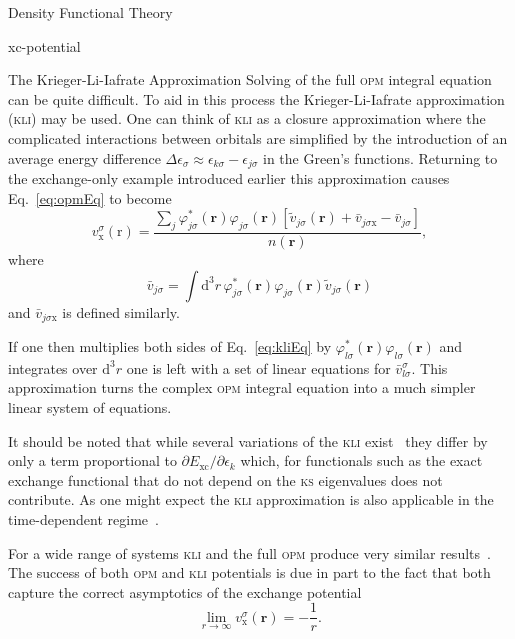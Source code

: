 \documentclass[letterpaper, 11 pt]{report}
\begin{document}
\begin{chapter}{Density Functional Theory \label{chap:dft}}
\begin{section}{xc-potential \label{sec:xcpot}}
\begin{subsection}{The Krieger-Li-Iafrate Approximation \label{sec:kli}}
         Solving of the full \textsc{opm} integral equation can be quite difficult. To aid in this
         process the Krieger-Li-Iafrate approximation~\cite{kli1} (\textsc{kli}) may be used. One can
         think of \textsc{kli} as a closure approximation where the complicated interactions between
         orbitals are simplified by the introduction of an average energy difference
         $\Delta \epsilon_\sigma \approx \epsilon_{k \sigma} - \epsilon_{j \sigma}$ in the Green's
         functions. Returning to the exchange-only example introduced earlier this approximation causes
         Eq.~\eqref{eq:opmEq} to become
         \begin{equation} \label{eq:kliEq}
            v_\mathrm{x}^\sigma(\mathrm{r}) =
               \frac{\sum\limits_{j} \varphi^*_{j \sigma} (\mathbf{r}) \varphi_{j \sigma} (\mathbf{r})
               \left[ \tilde{v}_{j \sigma}(\mathbf{r}) + \bar{v}_{j \sigma \mathrm{x}}
                                               - \bar{v}_{j \sigma} \right]}{n(\mathbf{r})},
         \end{equation}
         where
         \begin{equation}
            \bar{v}_{j \sigma} = \int \mathrm{d}^3 r \, \varphi^*_{j \sigma} (\mathbf{r})
               \varphi_{j \sigma} (\mathbf{r}) \tilde{v}_{j \sigma} (\mathbf{r})
         \end{equation}
         and $\bar{v}_{j \sigma \mathrm{x}}$ is defined similarly.

         If one then multiplies both sides of Eq.~\eqref{eq:kliEq} by $\varphi^*_{l \sigma} (\mathbf{r})
         \varphi_{l \sigma} (\mathbf{r})$ and integrates over $\mathrm{d}^3 r$ one is left with a set of
         linear equations for $\bar{v}^\sigma_{l \sigma}$. This approximation turns the complex
         \textsc{opm} integral equation into a much simpler linear system of equations.

         It should be noted that while several variations of the \textsc{kli} exist~\cite{kli1, kli2,
         kli3} they differ by only a term proportional to $\partial E_\mathrm{xc} / \partial \epsilon_k$
         which, for functionals such as the exact exchange functional that do not depend on the
         \textsc{ks} eigenvalues does not contribute. As one might expect the \textsc{kli} approximation
         is also applicable in the time-dependent regime~\cite{tdkli1, tdkli2, tdkli3}.

         For a wide range of systems \textsc{kli} and the full \textsc{opm} produce very similar
         results~\cite{opm-rev}. The success of both \textsc{opm} and \textsc{kli} potentials is due in
         part to the fact that both capture the correct asymptotics of the exchange potential
         \begin{equation}
            \lim\limits_{r \rightarrow \infty} v_\mathrm{x}^\sigma (\mathbf{r}) = -\frac{1}{r}.
         \end{equation}


\end{subsection}
\end{section}
\end{chapter}
\end{document}

